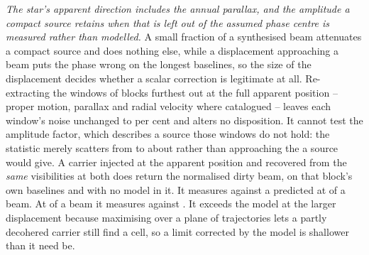\emph{The star's apparent direction includes the annual parallax, and the
amplitude a compact source retains when that is left out of the assumed phase
centre is measured rather than modelled.} A small fraction of a synthesised
beam attenuates a compact source and does nothing else, while a displacement
approaching a beam puts the phase wrong on the longest baselines, so the size
of the displacement decides whether a scalar correction is legitimate at all.
Re-extracting the \SensNReextWin{} windows of \SensNReextBlock{} blocks
furthest out at the full apparent position -- proper motion, parallax and
radial velocity where catalogued -- leaves each window's noise unchanged to
\SensReextNoiseMaxPct{} per cent and alters no disposition. It cannot test the
amplitude factor, which describes a source those windows do not hold: the
statistic merely scatters from \SensReTstarLo{} to \SensReTstarHi{} about
\SensReTstarMed{} rather than approaching the \SensPxLargePred{} a source
would give. A carrier injected at the apparent position and recovered from the
\emph{same} visibilities at both does return the normalised dirty beam, on
that block's own baselines and with no model in it. It measures
\SensPxSmallMeas{} against a predicted \SensPxSmallPred{} at
\SensPxSmallBeams{} of a beam. At \SensPxLargeBeams{} of a beam it measures
\SensPxLargeMeas{} against \SensPxLargePred. It
exceeds the model at the larger displacement because maximising over a plane
of trajectories lets a partly decohered carrier still find a cell, so a limit
corrected by the model is shallower than it need be.

